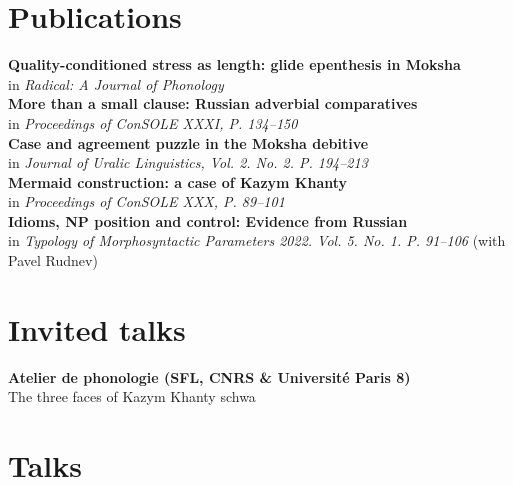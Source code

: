 \documentclass[11pt]{article} %
\begin{document}
\section*{Publications}
 \textbf{Quality-conditioned stress as length: glide epenthesis in Moksha} \\ in \emph{Radical: A Journal of Phonology}\\
 \textbf{More than a small clause: Russian adverbial comparatives} \\ in \emph{Proceedings of ConSOLE XXXI, P. 134--150}\\
 \textbf{Case and agreement puzzle in the Moksha debitive} \\ in \emph{Journal of Uralic Linguistics, Vol. 2. No. 2. P. 194--213}\\
 \textbf{Mermaid construction: a case of Kazym Khanty}\\ in \emph{Proceedings of ConSOLE XXX, P. 89--101}\\
 \textbf{Idioms, NP position and control: Evidence from Russian}\\ in \emph{Typology of Morphosyntactic Parameters 2022. Vol. 5. No. 1. P. 91--106} (with Pavel Rudnev)\\

\section*{Invited talks}

 \textbf{Atelier de phonologie (SFL, CNRS \& Université Paris 8)}\\ The three faces of Kazym Khanty schwa\\

\section*{Talks}
\end{document}
